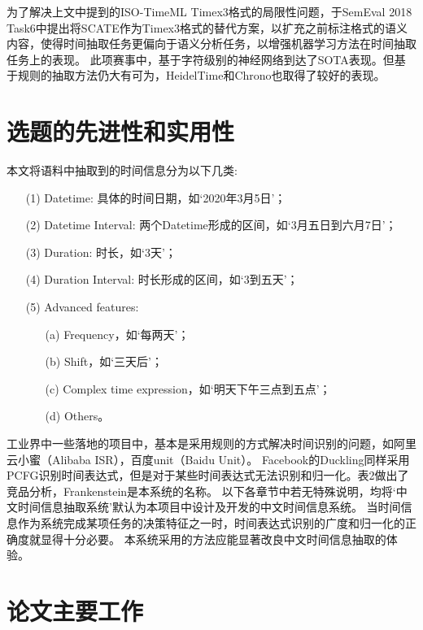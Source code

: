 为了解决上文中提到的ISO-TimeML Timex3格式的局限性问题，\citet{laparra2018characters}于SemEval 2018 Task6中提出将SCATE作为Timex3格式的替代方案，以扩充之前标注格式的语义内容，使得时间抽取任务更偏向于语义分析任务，以增强机器学习方法在时间抽取任务上的表现。
此项赛事中，\citet{laparra2018characters}基于字符级别的神经网络到达了SOTA表现。但基于规则的抽取方法仍大有可为，HeidelTime和Chrono也取得了较好的表现。

\section{选题的先进性和实用性}

本文将语料中抽取到的时间信息分为以下几类:
\begin{enumerate}
    \item[(1)]  Datetime: 具体的时间日期，如‘2020年3月5日’；
    \item[(2)]  Datetime Interval: 两个Datetime形成的区间，如‘3月五日到六月7日’；
    \item[(3)]  Duration: 时长，如‘3天’；
    \item[(4)]  Duration Interval: 时长形成的区间，如‘3到五天’；
    \item[(5)]  Advanced features:
        \begin{enumerate}
            \item[(a)]  Frequency，如‘每两天’；
            \item[(b)]   Shift，如‘三天后’；
            \item[(c)]  Complex time expression，如‘明天下午三点到五点’；
            \item[(d)] Others。
        \end{enumerate}
\end{enumerate}

工业界中一些落地的项目中，基本是采用规则的方式解决时间识别的问题，如阿里云小蜜（Alibaba ISR），百度unit（Baidu Unit）。
Facebook的Duckling同样采用PCFG识别时间表达式，但是对于某些时间表达式无法识别和归一化。表2做出了竞品分析，Frankenstein是本系统的名称。
以下各章节中若无特殊说明，均将‘中文时间信息抽取系统’默认为本项目中设计及开发的中文时间信息系统。
当时间信息作为系统完成某项任务的决策特征之一时，时间表达式识别的广度和归一化的正确度就显得十分必要。
本系统采用的方法应能显著改良中文时间信息抽取的体验。


\section{论文主要工作}

